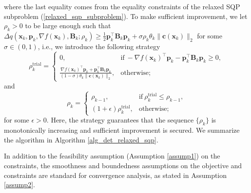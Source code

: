 \documentclass[aos]{imsart}
\numberwithin{equation}{section}
\theoremstyle{plain}
\begin{document}
where the last equality comes from the equality constraints of the relaxed SQP subproblem (\ref{relaxed_sqp_subproblem}). To make sufficient improvement, 
we let $\rho_k>0$ to be large enough such that
$\Delta q(\bm{x}_k,\bm{p}_k,\nabla f(\bm{x}_k),\bm{B}_k;\rho_k) \geq \frac{1}{2} \bm{p}_k^{\top} \bm{B}_k \bm{p}_k + \sigma \rho_k \theta_k \|\bm{c}(\bm{x}_k)\|_2$ for some $\sigma \in (0,1)$, i.e., we introduce the following strategy
\begin{equation*}
        \rho_k^{\text{trial}} = \left \{ \begin{array}{cc}
           0,  & \text{if}~ -\nabla f(\bm{x}_k)^{\top} \bm{p}_k - \bm{p}_k^{\top} \bm{B}_k \bm{p}_k \geq 0, \\
           \frac{\nabla f(\bm{x}_k)^{\top} \bm{p}_k + \bm{p}_k^{\top} \bm{B}_k \bm{p}_k}{(1-\sigma)\theta_k \|\bm{c}(\bm{x}_k)\|_2},  &  \text{otherwise;}
        \end{array}\right.
\end{equation*}
and
\begin{equation*}
    \rho_k = \left\{ \begin{array}{cc}
        \rho_{k-1}, &  \text{if}~\rho_{k}^{\text{trial}} \leq \rho_{k-1}, \\
        (1+\epsilon)\rho_{k}^{\text{trial}}, & \text{otherwise};
    \end{array} \right.
\end{equation*}
for some $\epsilon > 0$. Here, the strategy guarantees that the sequence $\{\rho_k\}$ is monotonically increasing and sufficient improvement is secured. We summarize the algorithm in Algorithm \ref{alg_det_relaxed_sqp}.

In addition to the feasibility assumption (Assumption \ref{assump1}) on the constraints, the smoothness and boundedness assumptions on the objective and constraints are standard for convergence analysis, as stated in Assumption \ref{assump2}.
\end{document}

